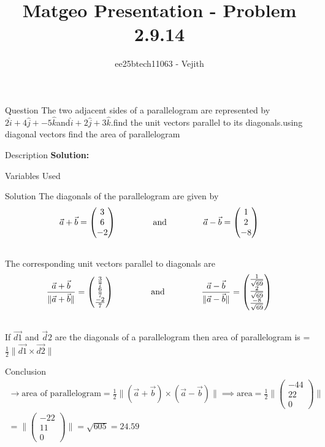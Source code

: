 \documentclass{beamer}
\title{Matgeo Presentation - Problem 2.9.14}
\author{ee25btech11063 - Vejith}
\numberwithin{equation}{section}
\theoremstyle{remark}
\providecommand{\norm}[1]{\lVert#1\rVert}
\newcommand{\myvec}[1]{\ensuremath{\begin{pmatrix}#1\end{pmatrix}}}
\begin{document}
\frame{\titlepage}
\begin{frame}{Question}
The two adjacent sides of a parallelogram are represented by $2\hat{i} + 4\hat{j} + -5\hat{k}$\hspace{0.3cm}and\hspace{0.3cm}$\hat{i} + 2\hat{j} + 3\hat{k}$.find the unit vectors parallel  to its diagonals.using diagonal vectors find the area of parallelogram
\end{frame}

\begin{frame}{Description}
\textbf{Solution: }\\
\begin{table}[h!]    
  \centering
  
  \caption{Variables Used}
  \label{}
\end{table}
\end{frame}

\begin{frame}{Solution}
The diagonals of the parallelogram are given by \\
\begin{align}
    \Vec{a}+\Vec{b}=\myvec{3\\6\\-2} \hspace{1.5cm} \text{and}\hspace{1.5cm} \Vec{a}-\Vec{b}=\myvec{1\\2\\-8}\\
    \notag
    \end{align}
 The corresponding unit vectors parallel to diagonals are\\
 \begin{align}
 \frac{\Vec{a}+\Vec{b}}{\norm{\Vec{a}+\Vec{b}}}=\myvec{\frac{3}{7}\\ \frac{6}{7}\\\frac{-2}{7}}\hspace{1.5cm} \text{and}\hspace{1.5cm} \frac{\Vec{a}-\Vec{b}}{\norm{\Vec{a}-\Vec{b}}}=\myvec{\frac{1}{\sqrt{69}}\\ \frac{2}{\sqrt{69}}\\\frac{-8}{\sqrt{69}}}\\
 \notag
 \end{align}
 If $\Vec{d1}$ and $\Vec{d}2$ are the diagonals of a parallelogram then area of parallelogram is =$\frac{1}{2}$$\norm{\Vec{d1}\times\Vec{d2}}$\\
 \end{frame}
 \begin{frame}{Conclusion}
 \begin{align}
 \rightarrow \text{area of parallelogram}=\frac{1}{2}\norm{(\Vec{a}+\Vec{b})\times(\Vec{a}-\Vec{b})}
\implies \text{area}=\frac{1}{2}\norm{\myvec{-44\\22\\0}}\\=\norm{\myvec{-22\\11\\0}}
= \sqrt{605}=24.59\end{align}
\end{frame}
\end{document}
